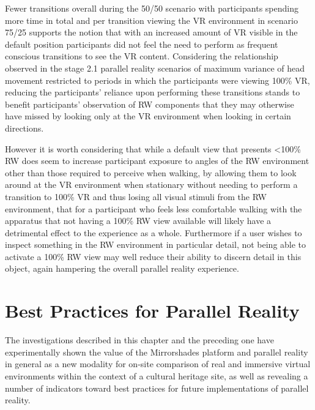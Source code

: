 Fewer transitions overall during the 50/50 scenario with participants spending more time in total and per transition viewing the VR environment in scenario 75/25 supports the notion that with an increased amount of VR visible in the default position participants did not feel the need to perform as frequent conscious transitions to see the VR content. Considering the relationship observed in the stage 2.1 parallel reality scenarios of maximum variance of head movement restricted to periods in which the participants were viewing 100\% VR, reducing the participants' reliance upon performing these transitions stands to benefit participants' observation of RW components that they may otherwise have missed by looking only at the VR environment when looking in certain directions.

However it is worth considering that while a default view that presents \textless 100\% RW does seem to increase participant exposure to angles of the RW environment other than those required to perceive when walking, by allowing them to look around at the VR environment when stationary without needing to perform a transition to 100\% VR and thus losing all visual stimuli from the RW environment, that for a participant who feels less comfortable walking with the apparatus that not having a 100\% RW view available will likely have a detrimental effect to the experience as a whole. Furthermore if a user wishes to inspect something in the RW environment in particular detail, not being able to activate a 100\% RW view may well reduce their ability to discern detail in this object, again hampering the overall parallel reality experience.


\section{Best Practices for Parallel Reality}

The investigations described in this chapter and the preceding one have experimentally shown the value of the Mirrorshades platform and parallel reality in general as a new modality for on-site comparison of real and immersive virtual environments within the context of a cultural heritage site, as well as revealing a number of indicators toward best practices for future implementations of parallel reality.

